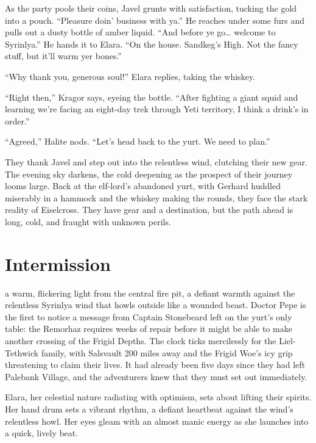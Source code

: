 \documentclass[
  letterpaper,12pt,twoside,twocolumn,openany,
  nodeprecatedcode,bg=full]{dndbook}
\begin{document}
As the party pools their coins, Javel grunts with satisfaction, tucking
the gold into a pouch. ``Pleasure doin' business with ya.'' He reaches
under some furs and pulls out a dusty bottle of amber liquid. ``And
before ye go\ldots{} welcome to Syrinlya.'' He hands it to Elara. ``On
the house. Sandkeg's High. Not the fancy stuff, but it'll warm yer
bones.''

``Why thank you, generous soul!'' Elara replies, taking the whiskey.

``Right then,'' Kragor says, eyeing the bottle. ``After fighting a giant
squid and learning we're facing an eight-day trek through Yeti
territory, I think a drink's in order.''

``Agreed,'' Halite nods. ``Let's head back to the yurt. We need to
plan.''

They thank Javel and step out into the relentless wind, clutching their
new gear. The evening sky darkens, the cold deepening as the prospect of
their journey looms large. Back at the elf-lord's abandoned yurt, with
Gerhard huddled miserably in a hammock and the whiskey making the
rounds, they face the stark reality of Eiselcross. They have gear and a
destination, but the path ahead is long, cold, and fraught with unknown
perils.

\chapter{Intermission}\label{intermission}

\hfill\break a warm,
flickering light from the central fire pit, a defiant warmth against the
relentless Syrinlya wind that howls outside like a wounded beast. Doctor
Pepe is the first to notice a message from Captain Stonebeard left on
the yurt's only table: the Remorhaz requires weeks of repair before it
might be able to make another crossing of the Frigid Depths. The clock
ticks mercilessly for the Liel-Tethwick family, with Salsvault 200 miles
away and the Frigid Woe's icy grip threatening to claim their lives. It
had already been five days since they had left Palebank Village, and the
adventurers knew that they must set out immediately.

Elara, her celestial nature radiating with optimism, sets about lifting
their spirits. Her hand drum sets a vibrant rhythm, a defiant heartbeat
against the wind's relentless howl. Her eyes gleam with an almost manic
energy as she launches into a quick, lively beat.
\end{document}
